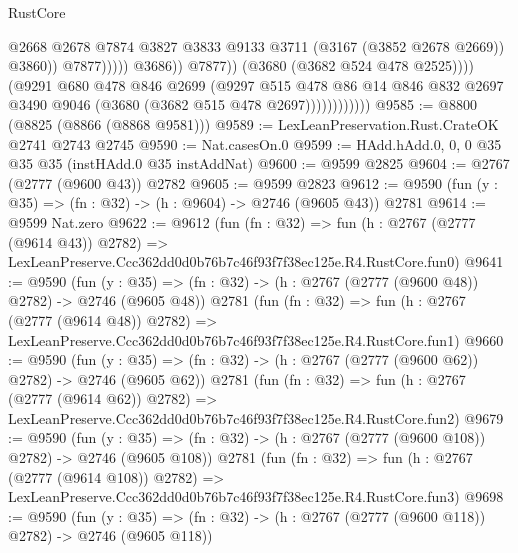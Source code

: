 \begin{lexlean}{RustCore}
\begin{coremodule}
                                              @2668
                                              @2678
                                              @7874
                                              @3827
                                              @3833
                                              @9133
                                              @3711
                                              (@3167 (@3852 @2678 @2669))
                                              @3860))
                                          @7877)))))
                                @3686))
                            @7877))
                        (@3680 (@3682 @524 @478 @2525))))
                    (@9291
                      @680
                      @478
                      @846
                      @2699
                      (@9297
                        @515
                        @478
                        @86
                        @14
                        @846
                        @832
                        @2697
                        @3490
                        @9046
                        (@3680 (@3682 @515 @478 @2697))))))))))))
@9585 := @8800 (@8825 (@8866 (@8868 @9581)))
@9589 := LexLeanPreservation.Rust.CrateOK @2741 @2743 @2745
@9590 := Nat.casesOn.{0}
@9599 := HAdd.hAdd.{0, 0, 0} @35 @35 @35 (instHAdd.{0} @35 instAddNat)
@9600 := @9599 @2825
@9604 := @2767 (@2777 (@9600 @43)) @2782
@9605 := @9599 @2823
@9612 := @9590 (fun (y : @35) => (fn : @32) -> (h : @9604) -> @2746 (@9605 @43)) @2781
@9614 := @9599 Nat.zero
@9622 := @9612
    (fun (fn : @32) =>
    fun (h : @2767 (@2777 (@9614 @43)) @2782) =>
    LexLeanPreserve.Ccc362dd0d0b76b7c46f93f7f38ec125e.R4.RustCore.fun0)
@9641 := @9590
    (fun (y : @35) => (fn : @32) -> (h : @2767 (@2777 (@9600 @48)) @2782) -> @2746 (@9605 @48))
    @2781
    (fun (fn : @32) =>
    fun (h : @2767 (@2777 (@9614 @48)) @2782) =>
    LexLeanPreserve.Ccc362dd0d0b76b7c46f93f7f38ec125e.R4.RustCore.fun1)
@9660 := @9590
    (fun (y : @35) => (fn : @32) -> (h : @2767 (@2777 (@9600 @62)) @2782) -> @2746 (@9605 @62))
    @2781
    (fun (fn : @32) =>
    fun (h : @2767 (@2777 (@9614 @62)) @2782) =>
    LexLeanPreserve.Ccc362dd0d0b76b7c46f93f7f38ec125e.R4.RustCore.fun2)
@9679 := @9590
    (fun (y : @35) => (fn : @32) -> (h : @2767 (@2777 (@9600 @108)) @2782) -> @2746 (@9605 @108))
    @2781
    (fun (fn : @32) =>
    fun (h : @2767 (@2777 (@9614 @108)) @2782) =>
    LexLeanPreserve.Ccc362dd0d0b76b7c46f93f7f38ec125e.R4.RustCore.fun3)
@9698 := @9590
    (fun (y : @35) => (fn : @32) -> (h : @2767 (@2777 (@9600 @118)) @2782) -> @2746 (@9605 @118))

\end{coremodule}
\end{lexlean}
